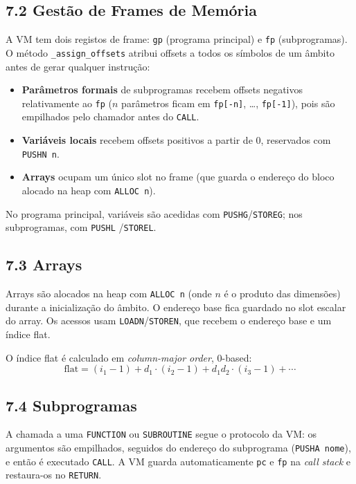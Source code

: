 \documentclass[a4paper]{article}
\begin{document}
\subsection*{7.2 Gestão de Frames de Memória}

\noindent A VM tem dois registos de frame: \texttt{gp} (programa principal) e \texttt{fp} (subprogramas). O método \texttt{\_assign\_offsets} atribui offsets a todos os símbolos de um âmbito antes de gerar qualquer instrução:

\begin{itemize}
    \item \textbf{Parâmetros formais} de subprogramas recebem offsets negativos relativamente ao \texttt{fp} ($n$ parâmetros ficam em \texttt{fp[-n]}, \ldots, \texttt{fp[-1]}), pois são empilhados pelo chamador antes do \texttt{CALL}.
    \item \textbf{Variáveis locais} recebem offsets positivos a partir de 0, reservados com \texttt{PUSHN n}.
    \item \textbf{Arrays} ocupam um único slot no frame (que guarda o endereço do bloco alocado na heap com \texttt{ALLOC n}).
\end{itemize}

\noindent No programa principal, variáveis são acedidas com \texttt{PUSHG}/\texttt{STOREG}; nos subprogramas, com \texttt{PUSHL} /\texttt{STOREL}.

\subsection*{7.3 Arrays}

\noindent Arrays são alocados na heap com \texttt{ALLOC n} (onde $n$ é o produto das dimensões) durante a inicialização do âmbito. O endereço base fica guardado no slot escalar do array. Os acessos usam \texttt{LOADN}/\texttt{STOREN}, que recebem o endereço base e um índice flat.

\vspace{0.2cm}

\noindent O índice flat é calculado em \textit{column-major order}, 0-based:
\[
\text{flat} = (i_1 - 1) + d_1 \cdot (i_2 - 1) + d_1 d_2 \cdot (i_3 - 1) + \cdots
\]

\subsection*{7.4 Subprogramas}

\noindent A chamada a uma \texttt{FUNCTION} ou \texttt{SUBROUTINE} segue o protocolo da VM: os argumentos são empilhados, seguidos do endereço do subprograma (\texttt{PUSHA nome}), e então é executado \texttt{CALL}. A VM guarda automaticamente \texttt{pc} e \texttt{fp} na \textit{call stack} e restaura-os no \texttt{RETURN}.
\end{document}
